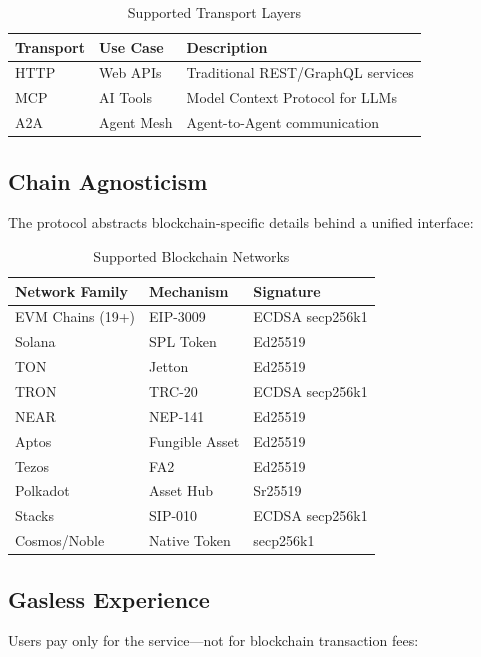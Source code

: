 \begin{table}[htbp]
\centering
\caption{Supported Transport Layers}
\label{tab:transports}
\begin{tabular}{l l p{5cm}}
\toprule
\textbf{Transport} & \textbf{Use Case} & \textbf{Description} \\
\midrule
HTTP & Web APIs & Traditional REST/GraphQL services \\
MCP & AI Tools & Model Context Protocol for LLMs \\
A2A & Agent Mesh & Agent-to-Agent communication \\
\bottomrule
\end{tabular}
\end{table}

\subsection{Chain Agnosticism}

The protocol abstracts blockchain-specific details behind a unified interface:

\begin{table}[htbp]
\centering
\caption{Supported Blockchain Networks}
\label{tab:chains-intro}
\begin{tabular}{l l l}
\toprule
\textbf{Network Family} & \textbf{Mechanism} & \textbf{Signature} \\
\midrule
EVM Chains (19+) & EIP-3009 & ECDSA secp256k1 \\
Solana & SPL Token & Ed25519 \\
TON & Jetton & Ed25519 \\
TRON & TRC-20 & ECDSA secp256k1 \\
NEAR & NEP-141 & Ed25519 \\
Aptos & Fungible Asset & Ed25519 \\
Tezos & FA2 & Ed25519 \\
Polkadot & Asset Hub & Sr25519 \\
Stacks & SIP-010 & ECDSA secp256k1 \\
Cosmos/Noble & Native Token & secp256k1 \\
\bottomrule
\end{tabular}
\end{table}

\subsection{Gasless Experience}

Users pay only for the service---not for blockchain transaction fees:

